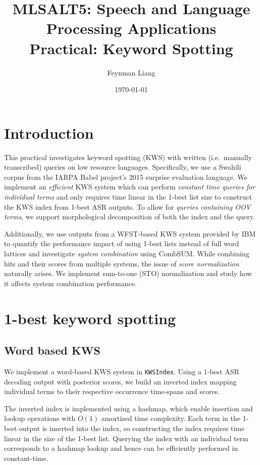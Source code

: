 \documentclass[a4paper,oneside,reqno]{amsart}
\newcommand{\authorname}{Feynman Liang}
\newcommand{\coursename}{MLSALT5: Speech and Language Processing Applications}
\newcommand{\assignmentname}{Practical: Keyword Spotting}
\begin{document}
\title{\coursename\\\assignmentname}

\author{\authorname}
\date{\today}

\maketitle

\section{Introduction}

This practical investigates keyword spotting (KWS) with written (i.e.\ manually
transcribed) queries on low resource languages. Specifically, we use a Swahili
corpus from the IARPA Babel project's 2015 surprise evaluation language. We
implement an \emph{efficient} KWS system which can perform \emph{constant time
queries for individual terms} and only requires time linear in the 1-best list
size to construct the KWS index from 1-best ASR outputs. To allow for
\emph{queries containing OOV terms}, we support morphological
decomposition\cite{narasimhan2014morphological} of both the index and the
query.

Additionally, we use outputs from a WFST-based KWS system provided by
IBM\cite{gales2014speech} to quantify the performance impact of using 1-best
lists instead of full word lattices and investigate \emph{system combination}
using CombSUM\cite{lee1997analyses}.  While combining hits and their scores
from multiple systems, the issue of \emph{score normalization} naturally
arises. We implement sum-to-one (STO) normalization\cite{mamou2013system} and
study how it affects system combination performance.

\section{1-best keyword spotting}

\subsection{Word based KWS}

We implement a word-based KWS system in \texttt{KWSIndex}. Using a 1-best ASR
decoding output with posterior scores, we build an inverted index mapping
individual terms to their respective occurrence time-spans and scores.

The inverted index is implemented using a hashmap, which enable insertion and
lookup operations with $O(1)$ amortized time complexity. Each term in the
1-best output is inserted into the index, so constructing the index requires
time linear in the size of the 1-best list. Querying the index with an individual
term corresponds to a hashmap lookup and hence can be efficiently performed in
constant-time.
\end{document}
